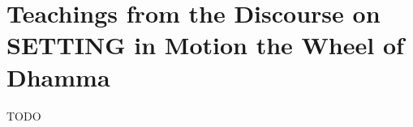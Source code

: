 %
%
%
%
%
%
%
%
%
%
%
%
%
%
%
%
%
%
%
%
%
%
%
%
%
\chapter{Teachings from the Discourse on SETTING in Motion the Wheel of Dhamma}%

\begin{leader}
\end{leader}

TODO

